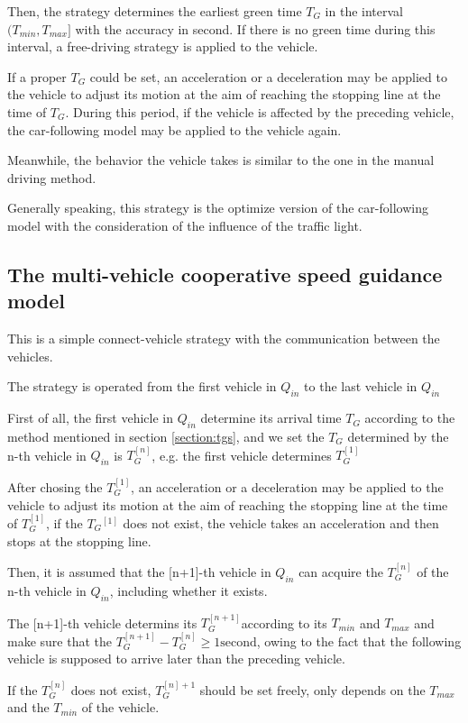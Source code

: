 \documentclass[a4paper,UTF8]{paper}
\begin{document}
Then, the strategy determines the earliest green time $T_G$ in the interval $(T_{min},T_{max}]$ with the accuracy in second. If there is no green time during this interval, a free-driving strategy is applied to the vehicle.

If a proper $T_G$ could be set, an acceleration or a deceleration may be applied to the vehicle to adjust its motion at the aim of reaching the stopping line at the time of $T_G$. During this period, if the vehicle is affected by the preceding vehicle, the car-following model may be applied to the vehicle again.

Meanwhile, the behavior the vehicle takes is similar to the one in the manual driving method.

Generally speaking, this strategy is the optimize version of the car-following model with the consideration of the influence of the traffic light.
\subsection{The multi-vehicle cooperative speed guidance model}
\label{section:st2}
This is a simple connect-vehicle strategy with the communication between the vehicles.

The strategy is operated from the first vehicle in $Q_{in}$ to the last vehicle in $Q_{in}$

First of all, the first vehicle in $Q_{in}$ determine its arrival time $T_G$ according to the method mentioned in section \ref{section:tgs}, and we set the $T_G$ determined by the n-th vehicle in $Q_{in}$ is $T_G^{[n]}$, e.g. the first vehicle determines $T_G^{[1]}$

After chosing the $T_G^{[1]}$, an acceleration or a deceleration may be applied to the vehicle to adjust its motion at the aim of reaching the stopping line at the time of $T_G^{[1]}$, if the $T_G{^[1]}$ does not exist, the vehicle takes an acceleration and then stops at the stopping line.

Then, it is assumed that the [n+1]-th vehicle in $Q_{in}$ can acquire the $T_G^{[n]}$ of the n-th vehicle in $Q_{in}$, including whether it exists.

The [n+1]-th vehicle determins its $T_G^{[n+1]}$according to its $T_{min}$ and $T_{max}$ and make sure that the $T_G^{[n+1]}-T_G^{[n]} \ge 1 \mathrm{second}$, owing to the fact that the following vehicle is supposed to arrive later than the preceding vehicle.

If the $T_G^{[n]}$ does not exist, $T_G^{[n]+1}$ should be set freely, only depends on the $T_{max}$ and the $T_{min}$ of the vehicle.
\end{document}
